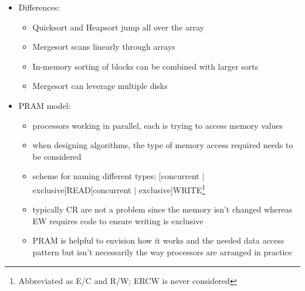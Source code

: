 \documentclass[a4paper]{article}
\begin{document}
\begin{itemize}
\begin{itemize}
\end{itemize}
\item Differences: 
\begin{itemize}
\item Quicksort and Heapsort jump all over the array
\item Mergesort scans linearly through arrays
\item In-memory sorting of blocks can be combined with larger sorts
\item Mergesort can leverage multiple disks
\end{itemize}
\item PRAM model: 
\begin{itemize}
\item processors working in parallel, each is trying to access memory values
\item when designing algorithms, the type of memory access required needs to be considered
\item scheme for naming different types: [concurrent $\mid$ exclusive]READ[concurrent $\mid$ exclusive]WRITE\footnote{Abbreviated as E/C and R/W; ERCW is never considered }
\item typically CR are not a problem since the memory isn’t changed whereas EW requires code to ensure writing is exclusive
\item PRAM is helpful to envision how it works and the needed data access pattern but isn’t necessarily the way processors are arranged in practice
\end{itemize}
\end{itemize}
\end{document}
